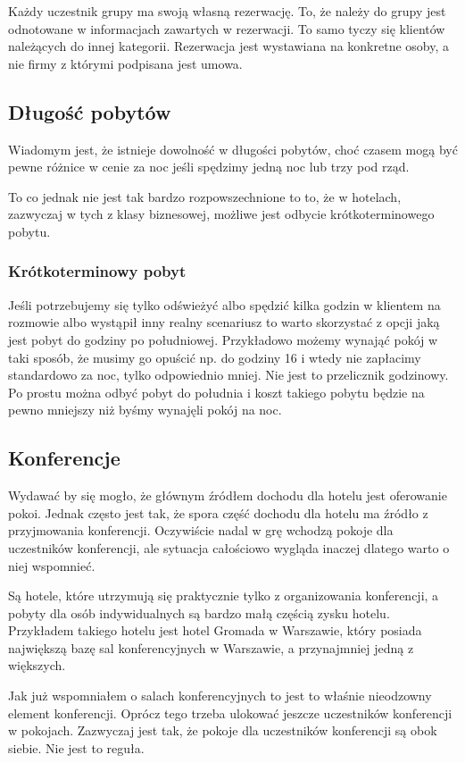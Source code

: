 \documentclass[a4paper,onecolumn,oneside,11pt,wide,floatssmall]{mwrep}
\theoremstyle{definition}
\theoremstyle{plain}%
\theoremstyle{remark}
\begin{document}
Każdy uczestnik grupy ma swoją własną rezerwację. To, że należy do grupy jest 
odnotowane w informacjach zawartych w rezerwacji. To samo tyczy się klientów 
należących do innej kategorii. Rezerwacja jest wystawiana na konkretne osoby, 
a nie firmy z którymi podpisana jest umowa.

\subsection{Długość pobytów}
Wiadomym jest, że istnieje dowolność w długości pobytów, choć czasem mogą być
pewne różnice w cenie za noc jeśli spędzimy jedną noc lub trzy pod rząd.

To co jednak nie jest tak bardzo rozpowszechnione to to, że w hotelach,
zazwyczaj w tych z klasy biznesowej, możliwe jest odbycie krótkoterminowego
pobytu.
\subsubsection{Krótkoterminowy pobyt}
Jeśli potrzebujemy się tylko odświeżyć albo spędzić kilka godzin w klientem na
rozmowie albo wystąpił inny realny scenariusz to warto skorzystać z opcji jaką
jest pobyt do godziny po południowej.
Przykładowo możemy wynająć pokój w taki sposób, że musimy go opuścić np. do
godziny 16 i wtedy nie zapłacimy standardowo za noc, tylko odpowiednio mniej.
Nie jest to przelicznik godzinowy. Po prostu można odbyć pobyt do południa i
koszt takiego pobytu będzie na pewno mniejszy niż byśmy wynajęli pokój na noc.

\subsection{Konferencje}
Wydawać by się mogło, że głównym źródłem dochodu dla hotelu jest oferowanie
pokoi. Jednak często jest tak, że spora część dochodu dla hotelu ma źródło z
przyjmowania konferencji. Oczywiście nadal w grę wchodzą pokoje dla uczestników
konferencji, ale sytuacja całościowo wygląda inaczej dlatego warto o niej
wspomnieć.

Są hotele, które utrzymują się praktycznie tylko z organizowania konferencji, a
pobyty dla osób indywidualnych są bardzo małą częścią zysku hotelu. Przykładem
takiego hotelu jest hotel Gromada w Warszawie, który posiada największą bazę sal
konferencyjnych w Warszawie, a przynajmniej jedną z większych.

Jak już wspomniałem o salach konferencyjnych to jest to właśnie nieodzowny
element konferencji. Oprócz tego trzeba ulokować jeszcze uczestników
konferencji w pokojach. Zazwyczaj jest tak, że pokoje dla uczestników
konferencji są obok siebie. Nie jest to reguła.
\end{document}
